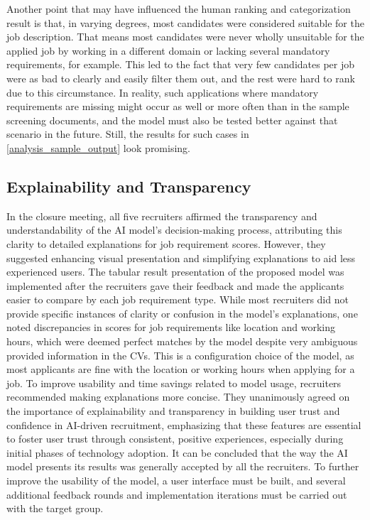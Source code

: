 \documentclass[draft,final]{thesisclass} %
\begin{document}
Another point that may have influenced the human ranking and categorization result is that, in varying degrees, most candidates were considered suitable for the job description. That means most candidates were never wholly unsuitable for the applied job by working in a different domain or lacking several mandatory requirements, for example. This led to the fact that very few candidates per job were as bad to clearly and easily filter them out, and the rest were hard to rank due to this circumstance. In reality, such applications where mandatory requirements are missing might occur as well or more often than in the sample screening documents, and the model must also be tested better against that scenario in the future. Still, the results for such cases in \ref{analysis_sample_output} look promising.

\subsection{Explainability and Transparency}
In the closure meeting, all five recruiters affirmed the transparency and understandability of the \acs{AI} model's decision-making process, attributing this clarity to detailed explanations for job requirement scores. However, they suggested enhancing visual presentation and simplifying explanations to aid less experienced users. The tabular result presentation of the proposed model was implemented after the recruiters gave their feedback and made the applicants easier to compare by each job requirement type. While most recruiters did not provide specific instances of clarity or confusion in the model's explanations, one noted discrepancies in scores for job requirements like location and working hours, which were deemed perfect matches by the model despite very ambiguous provided information in the \acs{CV}s. This is a configuration choice of the model, as most applicants are fine with the location or working hours when applying for a job. To improve usability and time savings related to model usage, recruiters recommended making explanations more concise. They unanimously agreed on the importance of explainability and transparency in building user trust and confidence in \acs{AI}-driven recruitment, emphasizing that these features are essential to foster user trust through consistent, positive experiences, especially during initial phases of technology adoption. It can be concluded that the way the \acs{AI} model presents its results was generally accepted by all the recruiters. To further improve the usability of the model, a user interface must be built, and several additional feedback rounds and implementation iterations must be carried out with the target group.
\end{document}

